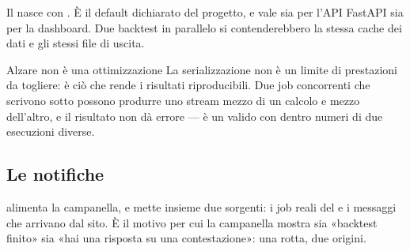 Il  nasce con . È il default
dichiarato del progetto, e vale sia per l'API FastAPI sia per la dashboard.
Due backtest in parallelo si contenderebbero la stessa cache dei dati e gli
stessi file di uscita.

\begin{attenzione}{Alzare  non è una ottimizzazione}
La serializzazione non è un limite di prestazioni da togliere: è ciò che
rende i risultati riproducibili. Due job concorrenti che scrivono sotto
 possono produrre uno stream mezzo di un
calcolo e mezzo dell'altro, e il risultato non dà errore --- è un
 valido con dentro numeri di due esecuzioni diverse.
\end{attenzione}

\subsection{Le notifiche}

 alimenta la campanella, e mette insieme due
sorgenti: i job reali del  e i messaggi che arrivano dal
sito. È il motivo per cui la campanella mostra sia «backtest finito» sia
«hai una risposta su una contestazione»: una rotta, due origini.
